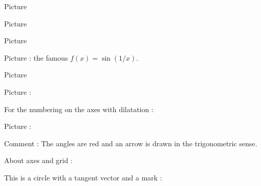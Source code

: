 
       Picture 
   \begin{center}

   \end{center}





Picture 
\newcommand{\CaptionFigOMPAooMbyOIqeA}{Marks are correct.}


\clearpage


Picture 
\begin{center}
   
\end{center}
   

\clearpage


Picture  : the famous \( f(x)=\sin(1/x)\).
\begin{center}
   
\end{center}
   

Picture 
\begin{center}
   
\end{center}
   

Picture : 
\begin{center}
   
\end{center}
   

For the numbering on the axes with dilatation : 
\begin{center}
   
\end{center}



Picture : 
\begin{center}
   
\end{center}
Comment : The angles are red and an arrow is drawn in the trigonometric sense.



About axes and grid : 
\begin{center}
   
\end{center}
   


This is a circle with a tangent vector and a mark :

